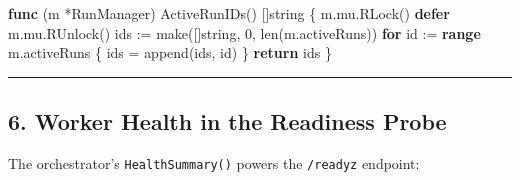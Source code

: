 \documentclass[
]{article}
\newenvironment{Shaded}{}{}
\newcommand{\BuiltInTok}[1]{\textcolor[rgb]{0.00,0.50,0.00}{#1}}
\newcommand{\ControlFlowTok}[1]{\textcolor[rgb]{0.00,0.44,0.13}{\textbf{#1}}}
\newcommand{\DataTypeTok}[1]{\textcolor[rgb]{0.56,0.13,0.00}{#1}}
\newcommand{\DecValTok}[1]{\textcolor[rgb]{0.25,0.63,0.44}{#1}}
\newcommand{\KeywordTok}[1]{\textcolor[rgb]{0.00,0.44,0.13}{\textbf{#1}}}
\newcommand{\NormalTok}[1]{#1}
\newcommand{\OperatorTok}[1]{\textcolor[rgb]{0.40,0.40,0.40}{#1}}
\begin{document}
\begin{Shaded}
\begin{Highlighting}[]
\KeywordTok{func} \OperatorTok{(}\NormalTok{m }\OperatorTok{*}\NormalTok{RunManager}\OperatorTok{)}\NormalTok{ ActiveRunIDs}\OperatorTok{()} \OperatorTok{[]}\DataTypeTok{string} \OperatorTok{\{}
\NormalTok{    m}\OperatorTok{.}\NormalTok{mu}\OperatorTok{.}\NormalTok{RLock}\OperatorTok{()}
    \ControlFlowTok{defer}\NormalTok{ m}\OperatorTok{.}\NormalTok{mu}\OperatorTok{.}\NormalTok{RUnlock}\OperatorTok{()}
\NormalTok{    ids }\OperatorTok{:=} \BuiltInTok{make}\OperatorTok{([]}\DataTypeTok{string}\OperatorTok{,} \DecValTok{0}\OperatorTok{,} \BuiltInTok{len}\OperatorTok{(}\NormalTok{m}\OperatorTok{.}\NormalTok{activeRuns}\OperatorTok{))}
    \ControlFlowTok{for}\NormalTok{ id }\OperatorTok{:=} \KeywordTok{range}\NormalTok{ m}\OperatorTok{.}\NormalTok{activeRuns }\OperatorTok{\{}
\NormalTok{        ids }\OperatorTok{=} \BuiltInTok{append}\OperatorTok{(}\NormalTok{ids}\OperatorTok{,}\NormalTok{ id}\OperatorTok{)}
    \OperatorTok{\}}
    \ControlFlowTok{return}\NormalTok{ ids}
\OperatorTok{\}}
\end{Highlighting}
\end{Shaded}

\begin{center}\rule{0.5\linewidth}{0.5pt}\end{center}

\hypertarget{worker-health-in-the-readiness-probe}{%
\subsection{6. Worker Health in the Readiness
Probe}\label{worker-health-in-the-readiness-probe}}

The orchestrator's \texttt{HealthSummary()} powers the \texttt{/readyz}
endpoint:
\end{document}
